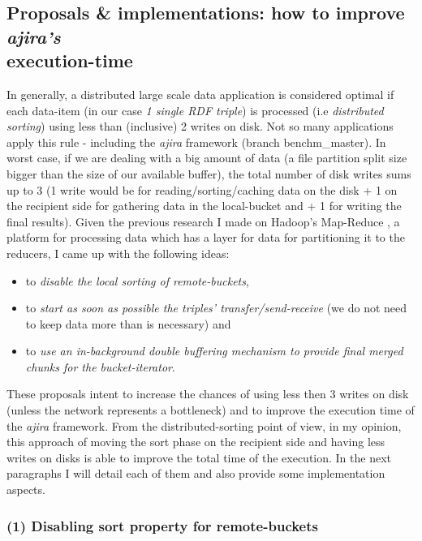 % 
\subsection{Proposals \& implementations: how to improve \textit{ajira's} \\ execution-time}

In generally, a distributed large scale data application is considered optimal if each data-item (in our case \textit{1 single RDF triple}) is processed (i.e \textit{distributed sorting}) using less than (inclusive) 2 writes on disk. Not so many applications apply this rule - including the \textit{ajira} framework (branch benchm\_master). In worst case, if we are dealing with a big amount of data (a file partition split size bigger than the size of our available buffer), the total number of disk writes sums up to 3 (1 write would be for reading/sorting/caching data on the disk + 1 on the recipient side for gathering data in the local-bucket and + 1 for writing the final results). Given the previous research I made on Hadoop's Map-Reduce \cite{hadoop}, a platform for processing data which has a layer for data \cite{shuffling} for partitioning it to the reducers, I came up with the following ideas: 
\begin{itemize}
\item to \textit{disable the local sorting of remote-buckets},
\item to \textit{start as soon as possible the triples' transfer/send-receive} (we do not need to keep data more than is necessary) and
\item to \textit{use an in-background double buffering mechanism to provide final merged chunks for the bucket-iterator}. 
\end{itemize}
  
These proposals intent to increase the chances of using less then 3 writes on disk (unless the network represents a bottleneck) and to improve the execution time of the \textit{ajira} framework. From the distributed-sorting point of view, in my opinion, this approach of moving the sort phase on the recipient side and having less writes on disks is able to improve the total time of the execution. In the next paragraphs I will detail each of them and also provide some implementation aspects.

% 
\subsubsection*{(1) Disabling sort property for remote-buckets}

